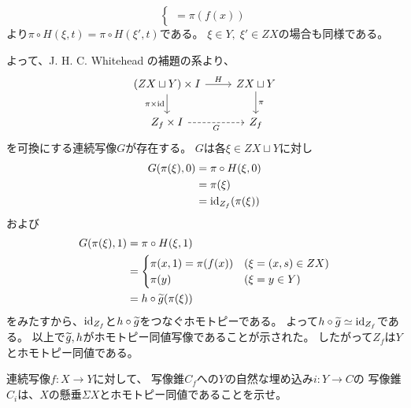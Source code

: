 \documentclass[report]{jlreq}
\begin{document}
\begin{answer}
\begin{itemize}
\begin{equation}
\begin{cases}
                        = \pi(f(x))
                \end{cases}
            \end{equation}
            より$\pi \circ H(\xi, t) = \pi \circ H(\xi', t)$である。
            $\xi \in Y,\; \xi' \in ZX$の場合も同様である。
    \end{itemize}
    よって、J. H. C. Whitehead の補題の系より、
    \begin{equation}
        \begin{tikzcd}
            (ZX \sqcup Y) \times I
                \ar{d}[swap]{\pi \times \id}
                \ar{r}{H}
                & ZX \sqcup Y
                \ar{d}{\pi} \\
            Z_f \times I
                \ar[dashed]{r}[swap]{G}
                & Z_f
        \end{tikzcd}
    \end{equation}
    を可換にする連続写像$G$が存在する。
    $G$は各$\xi \in ZX \sqcup Y$に対し
    \begin{alignat}{1}
        G(\pi(\xi), 0)
            &= \pi \circ H(\xi, 0) \\
            &= \pi(\xi) \\
            &= \mathrm{id}_{Z_f}(\pi(\xi))
    \end{alignat}
    および
    \begin{alignat}{1}
        G(\pi(\xi), 1)
            &= \pi \circ H(\xi, 1) \\
            &= \begin{cases}
                \pi(x, 1) = \pi(f(x)) & (\xi = (x, s) \in ZX) \\
                \pi(y) & (\xi = y \in Y)
            \end{cases} \\
            &= h \circ \widetilde{g}(\pi(\xi))
    \end{alignat}
    をみたすから、$\mathrm{id}_{Z_f}$と$h \circ \widetilde{g}$をつなぐホモトピーである。
    よって$h \circ \widetilde{g} \simeq \mathrm{id}_{Z_f}$である。
    以上で$\widetilde{g}, h$がホモトピー同値写像であることが示された。
    したがって$Z_f$は$Y$とホモトピー同値である。
\end{answer}

\begin{problem}[幾何学II 3.5]
    連続写像$f \colon X \to Y$に対して、
    写像錐$C_f$への$Y$の自然な埋め込み$i \colon Y \to C$の
    写像錐$C_i$は、$X$の懸垂$\Sigma X$とホモトピー同値であることを示せ。
\end{problem}
\end{document}
